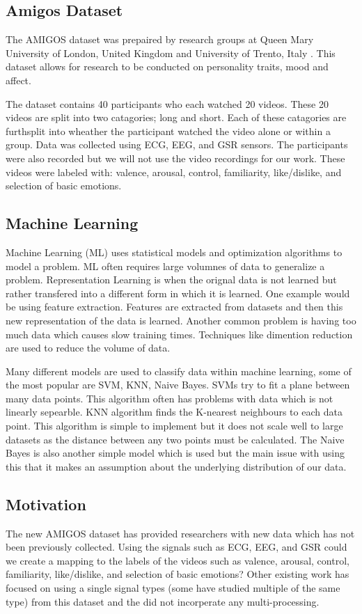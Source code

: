 \subsection{Amigos Dataset}
The AMIGOS dataset was prepaired by research groups at
Queen Mary University of London, United Kingdom and
University of Trento, Italy \cite{AMIGOS:2018}.
This dataset allows for research to be conducted on
personality traits, mood and affect.

The dataset contains 40 participants who each watched 20 videos.
These 20 videos are split into two catagories; long and short.
Each of these catagories are furthsplit into
wheather the participant watched the video alone or within a group.
Data was collected using ECG, EEG, and GSR sensors.
The participants were also recorded but we will not use the video recordings
for our work.
These videos were labeled with:
valence, arousal, control, familiarity, like/dislike,
and selection of basic emotions.

\subsection{Machine Learning}
Machine Learning (ML) uses statistical models and
optimization algorithms to model a problem.
ML often requires large volumnes of data to generalize a problem.
Representation Learning is when the orignal data is not learned
but rather transfered into a different form in which it is learned.
One example would be using feature extraction.
Features are extracted from datasets and then this new representation of the data
is learned.
Another common problem is having too much data which causes slow training times.
Techniques like dimention reduction are used to reduce the volume of
data.

Many different models are used to classify data within machine learning,
some of the most popular are SVM, KNN, Naive Bayes.
SVMs try to fit a plane between many data points.
This algorithm often has problems with data which is not
linearly sepearble.
KNN algorithm finds the K-nearest neighbours to each data point.
This algorithm is simple to implement but it does not scale well
to large datasets as the distance between any two points must be calculated.
The Naive Bayes is also another simple model which is used but the main issue
with using this that it makes an assumption about the underlying distribution of
our data.

\subsection{Motivation}
The new AMIGOS dataset has provided researchers with new
data which has not been previously collected.
Using the signals such as ECG, EEG, and GSR
could we create a mapping to the
labels of the videos such as
valence, arousal, control, familiarity, like/dislike,
and selection of basic emotions?
Other existing work has focused on using a single signal types
(some have studied multiple of the same type) from this dataset
and the did not incorperate any multi-processing.


